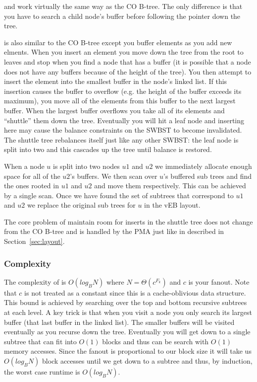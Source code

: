 \documentclass{style}
\begin{document}
\Search and \Scan work virtually the same way as the CO B-tree. The only
difference is that you have to search a child node's buffer before following
the pointer down the tree.

\Insert is also similar to the CO B-tree except you buffer elements as you add
new elments. When you insert an element you move down the tree from the root
to leaves and stop when you find a node that has a buffer (it is possible that
a node does not have any buffers because of the height of the tree). You then
attempt to insert the element into the smallest buffer in the node's linked
list. If this insertion causes the buffer to overflow (e.g. the height of the
buffer exceeds its maximum), you move all of the elements from this buffer to
the next largest buffer. When the largest buffer overflows you take all of its
elements and ``shuttle'' them down the tree. Eventually you will hit a leaf
node and inserting here may cause the balance constraints on the SWBST to
become invalidated. The shuttle tree rebalances itself just like any other
SWBST: the leaf node is split into two and this cascades up the tree until
balance is restored.

When a node $u$ is split into two nodes $u1$ and $u2$ we immediately allocate
enough space for all of the $u2$'s buffers. We then scan over $u$'s buffered
sub trees and find the ones rooted in $u1$ and $u2$ and move them
respectively. This can be achieved by a single scan. Once we have found the
set of subtrees that correspond to $u1$ and $u2$ we replace the original sub
trees for $u$ in the vEB layout.

The core problem of maintain room for inserts in the shuttle tree does not
change from the CO B-tree and is handled by the PMA just like in described in
Section~\ref{sec:layout}.

\subsubsection{Complexity}

The complexity of \Search is $O(log_B N)$ where $N = \Theta(c^{F_k})$ and $c$
is your fanout. Note that $c$ is not treated as a constant since this is a
cache-oblivious data structure. This bound is achieved by searching over the
top and bottom recursive subtrees at each level. A key trick is that when you
visit a node you only search its largest buffer (that last buffer in the
linked list). The smaller buffers will be visited eventually as you recurse
down the tree. Eventually you will get down to a single subtree that can fit
into $O(1)$ blocks and thus can be search with $O(1)$ memory accesses. Since
the fanout is proportional to our block size it will take us $O(log_B N)$
block accesses until we get down to a subtree and thus, by induction, the
worst case runtime is $O(log_B N)$.
\end{document}
